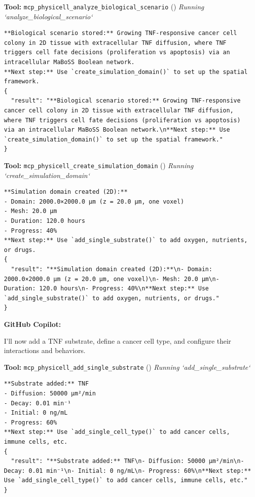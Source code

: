 \documentclass[11pt,a4paper]{article}
\begin{document}
\begin{toolokbox}
\textbf{Tool:} \texttt{mcp\_physicell\_analyze\_biological\_scenario} (\checkmark)
\textit{Running `analyze\_biological\_scenario`}
\begin{lstlisting}
**Biological scenario stored:** Growing TNF-responsive cancer cell colony in 2D tissue with extracellular TNF diffusion, where TNF triggers cell fate decisions (proliferation vs apoptosis) via an intracellular MaBoSS Boolean network.
**Next step:** Use `create_simulation_domain()` to set up the spatial framework.
{
  "result": "**Biological scenario stored:** Growing TNF-responsive cancer cell colony in 2D tissue with extracellular TNF diffusion, where TNF triggers cell fate decisions (proliferation vs apoptosis) via an intracellular MaBoSS Boolean network.\n**Next step:** Use `create_simulation_domain()` to set up the spatial framework."
}
\end{lstlisting}
\end{toolokbox}
\begin{toolokbox}
\textbf{Tool:} \texttt{mcp\_physicell\_create\_simulation\_domain} (\checkmark)
\textit{Running `create\_simulation\_domain`}
\begin{lstlisting}
**Simulation domain created (2D):**
- Domain: 2000.0×2000.0 μm (z = 20.0 μm, one voxel)
- Mesh: 20.0 μm
- Duration: 120.0 hours
- Progress: 40%
**Next step:** Use `add_single_substrate()` to add oxygen, nutrients, or drugs.
{
  "result": "**Simulation domain created (2D):**\n- Domain: 2000.0×2000.0 μm (z = 20.0 μm, one voxel)\n- Mesh: 20.0 μm\n- Duration: 120.0 hours\n- Progress: 40%\n**Next step:** Use `add_single_substrate()` to add oxygen, nutrients, or drugs."
}
\end{lstlisting}
\end{toolokbox}
\begin{copilotbox}
\textbf{GitHub Copilot:}

I'll now add a TNF substrate, define a cancer cell type, and configure their interactions and behaviors.

\end{copilotbox}
\begin{toolokbox}
\textbf{Tool:} \texttt{mcp\_physicell\_add\_single\_substrate} (\checkmark)
\textit{Running `add\_single\_substrate`}
\begin{lstlisting}
**Substrate added:** TNF
- Diffusion: 50000 μm²/min
- Decay: 0.01 min⁻¹
- Initial: 0 ng/mL
- Progress: 60%
**Next step:** Use `add_single_cell_type()` to add cancer cells, immune cells, etc.
{
  "result": "**Substrate added:** TNF\n- Diffusion: 50000 μm²/min\n- Decay: 0.01 min⁻¹\n- Initial: 0 ng/mL\n- Progress: 60%\n**Next step:** Use `add_single_cell_type()` to add cancer cells, immune cells, etc."
}
\end{lstlisting}
\end{toolokbox}
\end{document}
